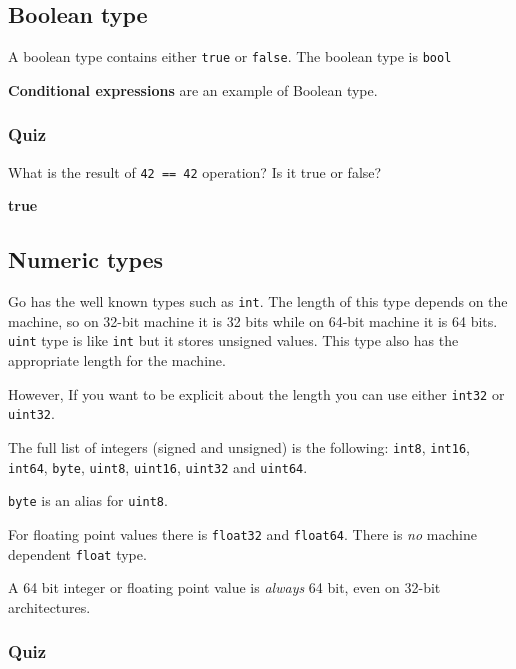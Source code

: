 \documentclass[]{book}
\let\BeginKnitrBlock\begin \let\EndKnitrBlock\end
\begin{document}
\hypertarget{boolean-type}{%
\subsection{Boolean type}\label{boolean-type}}

A boolean type contains either \texttt{true} or \texttt{false}. The boolean type is \texttt{bool}

\BeginKnitrBlock{rmdnote}
\textbf{Conditional expressions} are an example of Boolean type.
\EndKnitrBlock{rmdnote}

\hypertarget{quiz-5}{%
\subsubsection*{Quiz}\label{quiz-5}}

What is the result of \texttt{42\ ==\ 42} operation? Is it true or false?

\textbf{true}

\hypertarget{numeric-types}{%
\subsection{Numeric types}\label{numeric-types}}

Go has the well known types such as \texttt{int}. The length of this type depends on
the machine, so on 32-bit machine it is 32 bits while on 64-bit machine it is
64 bits. \texttt{uint} type is like \texttt{int} but it stores unsigned values. This type
also has the appropriate length for the machine.

However, If you want to be explicit about the length you can use either \texttt{int32}
or \texttt{uint32}.

The full list of integers (signed and unsigned) is the following: \texttt{int8},
\texttt{int16}, \texttt{int64}, \texttt{byte}, \texttt{uint8}, \texttt{uint16}, \texttt{uint32} and \texttt{uint64}.

\BeginKnitrBlock{rmdnote}
\texttt{byte} is an alias for \texttt{uint8}.
\EndKnitrBlock{rmdnote}

For floating point values there is \texttt{float32} and \texttt{float64}. There is \emph{no}
machine dependent \texttt{float} type.

\BeginKnitrBlock{rmdnote}
A 64 bit integer or floating point value is \emph{always} 64 bit, even on 32-bit
architectures.
\EndKnitrBlock{rmdnote}

\hypertarget{quiz-6}{%
\subsubsection*{Quiz}\label{quiz-6}}
\end{document}
